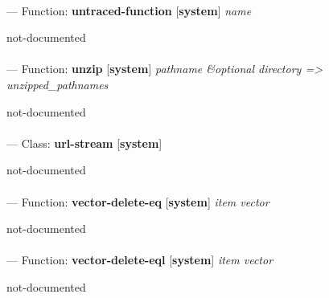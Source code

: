 \paragraph{}
\label{SYSTEM:UNTRACED-FUNCTION}
--- Function: \textbf{untraced-function} [\textbf{system}] \textit{name}

\begin{adjustwidth}{5em}{5em}
not-documented
\end{adjustwidth}

\paragraph{}
\label{SYSTEM:UNZIP}
--- Function: \textbf{unzip} [\textbf{system}] \textit{pathname \&optional directory => unzipped\_pathnames}

\begin{adjustwidth}{5em}{5em}
not-documented
\end{adjustwidth}

\paragraph{}
\label{SYSTEM:URL-STREAM}
--- Class: \textbf{url-stream} [\textbf{system}] \textit{}

\begin{adjustwidth}{5em}{5em}
not-documented
\end{adjustwidth}

\paragraph{}
\label{SYSTEM:VECTOR-DELETE-EQ}
--- Function: \textbf{vector-delete-eq} [\textbf{system}] \textit{item vector}

\begin{adjustwidth}{5em}{5em}
not-documented
\end{adjustwidth}

\paragraph{}
\label{SYSTEM:VECTOR-DELETE-EQL}
--- Function: \textbf{vector-delete-eql} [\textbf{system}] \textit{item vector}

\begin{adjustwidth}{5em}{5em}
not-documented
\end{adjustwidth}

